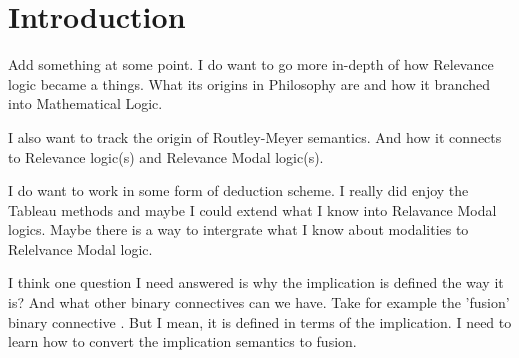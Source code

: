 \section{Introduction}
\par Add something at some point. I do want to go more in-depth of how Relevance logic became a things. What its origins in Philosophy are and how it branched into Mathematical Logic.

\par I also want to track the origin of Routley-Meyer semantics. And how it connects to Relevance logic(s) and Relevance Modal logic(s).

\par I do want to work in some form of deduction scheme. I really did enjoy the Tableau methods and maybe I could extend what I know into Relavance Modal logics. Maybe there is a way to intergrate what I know about modalities to Relelvance Modal logic.

\par I think one question I need answered is why the implication is defined the way it is? And what other binary connectives can we have. Take for example the 'fusion' binary connective \cite{de2024fusion}. But I mean, it is defined in terms of  the implication. I need to learn how to convert the implication semantics to fusion. 